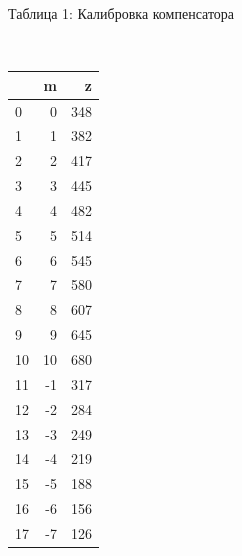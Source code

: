 \documentclass[12pt]{article}
\begin{document}
    \begin{minipage}[t]{0.2\linewidth}
        \centering
        \caption{Таблица 1: Калибровка компенсатора}\\
        \label{tab:tab1}
        \begin{tabular}{|l|r|r|}
            \hline
            & m  & z   \\
            \hline
            0  & 0  & 348 \\
            1  & 1  & 382 \\
            2  & 2  & 417 \\
            3  & 3  & 445 \\
            4  & 4  & 482 \\
            5  & 5  & 514 \\
            6  & 6  & 545 \\
            7  & 7  & 580 \\
            8  & 8  & 607 \\
            9  & 9  & 645 \\
            10 & 10 & 680 \\
            11 & -1 & 317 \\
            12 & -2 & 284 \\
            13 & -3 & 249 \\
            14 & -4 & 219 \\
            15 & -5 & 188 \\
            16 & -6 & 156 \\
            17 & -7 & 126 \\
            \hline
        \end{tabular}
    \end{minipage}
    \hfill
\end{document}
